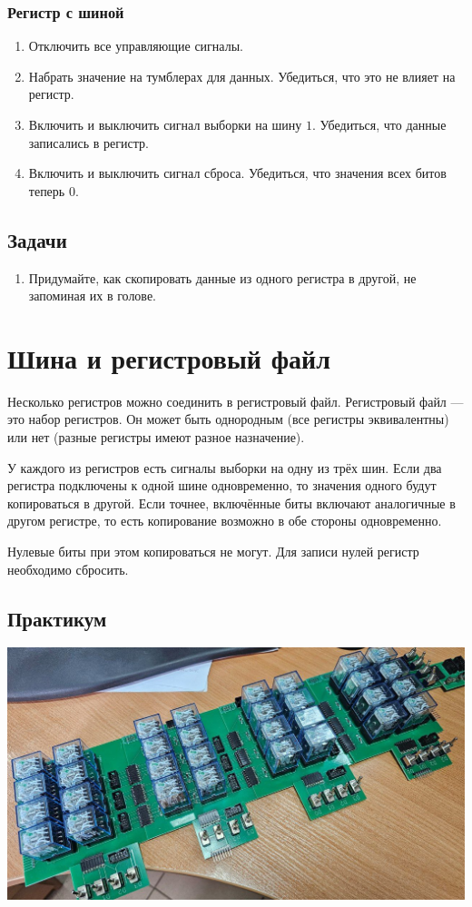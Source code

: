 \subsubsection{Регистр с шиной}

\begin{enumerate}
    \item Отключить все управляющие сигналы.
    \item Набрать значение на тумблерах для данных. Убедиться, что это не влияет на регистр.
    \item Включить и выключить сигнал выборки на шину $1$. Убедиться, что данные записались в регистр.
    \item Включить и выключить сигнал сброса. Убедиться, что значения всех битов теперь $0$.
\end{enumerate}

\subsection{Задачи}

\begin{enumerate}
    \item Придумайте, как скопировать данные из одного регистра в другой, не запоминая их в голове.
\end{enumerate}


\section{Шина и регистровый файл}

Несколько регистров можно соединить в регистровый файл.
Регистровый файл --- это набор регистров. Он может быть однородным
(все регистры эквивалентны) или нет (разные регистры имеют разное назначение).

У каждого из регистров есть сигналы выборки на одну из трёх шин.
Если два регистра подключены к одной шине одновременно,
то значения одного будут копироваться в другой. Если точнее,
включённые биты включают аналогичные в другом регистре, то есть
копирование возможно в обе стороны одновременно.

Нулевые биты при этом копироваться не могут. Для записи нулей
регистр необходимо сбросить.


\subsection{Практикум}


\includegraphics[width=\columnwidth]{photo/register_file.jpg}


